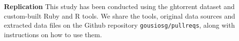 \documentclass{sig-alternate}
\begin{document}
{\bfseries Replication} This study has been conducted using the {\sc ght}orrent
dataset and custom-built Ruby and R tools. We share the tools, original data
sources and extracted data files on the Github repository
\texttt{gousiosg\-/\-pullreqs}, along with instructions on how to use them.




\balance
\begin{small}

  
\end{small}
\end{document}
